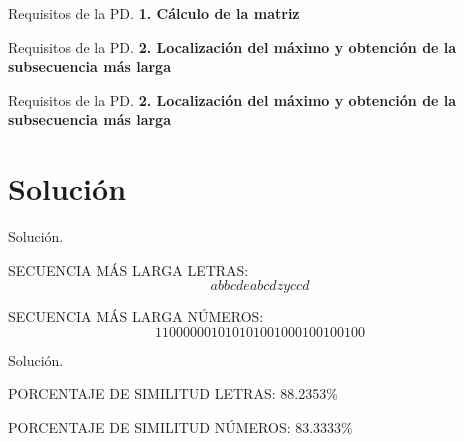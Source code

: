 \documentclass[10pt, xcolor=table]{beamer}
\begin{document}
\begin{frame}[fragile]{Requisitos de la PD. }
	\textbf{1. Cálculo de la matriz}
	
\end{frame}

\begin{frame}[fragile]{Requisitos de la PD. }
	\textbf{2. Localización del máximo y obtención de la subsecuencia más larga}
	
\end{frame}

\begin{frame}[fragile]{Requisitos de la PD. }
	\textbf{2. Localización del máximo y obtención de la subsecuencia más larga}
	
\end{frame}


\section{Solución}
\begin{frame}[fragile]{Solución. }
		\begin{center}
			SECUENCIA MÁS LARGA LETRAS: 
			\[
			a b b c d e a b c d z y c c d
			\]
			
			SECUENCIA MÁS LARGA NÚMEROS: 
			\[
			1 1 0 0 0 0 0 0 1 0 1 0 1 0 1 0 0 1 0 0 0 1 0 0 1 0 0 1 0 0
			\]
		\end{center}
\end{frame}

\begin{frame}[fragile]{Solución. }

		\begin{center}
			PORCENTAJE DE SIMILITUD LETRAS: 88.2353\%
			
			PORCENTAJE DE SIMILITUD NÚMEROS: 83.3333\%
		\end{center}
\end{frame}
\end{document}
